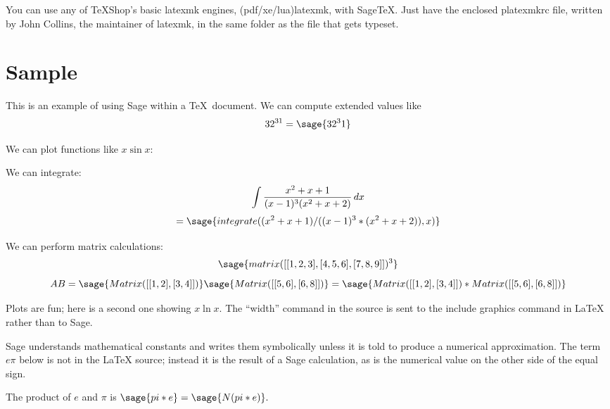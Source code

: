 \documentclass[11pt]{article}
\newcommand{\TS}{\textsf{\TeX Shop}}
\begin{document}
You can use any of \TS's basic \textsf{latexmk} engines, \textsf{(pdf/xe/lua)latexmk}, with \textsf{SageTeX}. Just have the enclosed \textsf{platexmkrc} file, written by John Collins, the maintainer of \textsf{latexmk}, in the same folder as the file that gets typeset.

\section{Sample}

This is an example of using Sage within a \TeX\ document. We can compute extended values like 
\[
32^{31} = \sage{32^31}
\]
	
We can plot functions like $x \sin x$:

\begin{center}
\end{center}

\newpage
 We can integrate:
 $$\int {{x^2 + x + 1} \over {(x - 1)^3 (x^2 + x + 2)}}\,dx$$
 $$=  \sage{integrate( (x^2 + x + 1) / ((x - 1)^3 * (x^2 + x + 2)), x )}$$
 
 We can perform matrix calculations:
 $$\sage{matrix([[1, 2, 3], [4, 5, 6], [7, 8, 9]])^3}$$
 $$AB=  \sage{Matrix([[1, 2], [3, 4]])} \sage{Matrix([[5, 6], [6, 8]])} = \sage{Matrix([[1, 2], [3, 4]]) * Matrix([[5, 6], [6, 8]])}$$


Plots are fun; here is a second one showing $x \ln x$. The ``width'' command in the source is sent to the include graphics command in LaTeX rather than to Sage.

\begin{center}
\end{center}

Sage understands mathematical constants and writes them symbolically unless it is told to produce a numerical approximation. The term $e \pi$ below is not in the LaTeX source; instead it is the result of a Sage calculation, as is the numerical value on the other side of the equal sign.

The product of $e$ and $\pi$ is $\sage{pi * e} = \sage{N(pi * e)}.$
\end{document}
